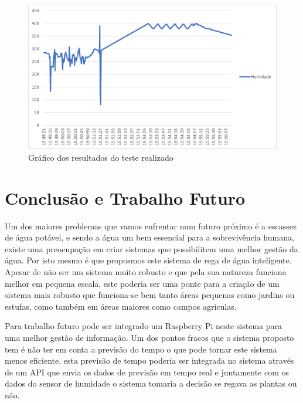 \documentclass[conference]{IEEEtran}
\begin{document}
\begin{figure}
    \centering
    \includegraphics[scale=0.5]{Humidity_test_graph.png}
    \caption{Gráfico dos resultados do teste realizado}
    \label{fig:graphic}
\end{figure}

\section{Conclusão e Trabalho Futuro}

Um dos maiores problemas que vamos enfrentar num futuro próximo é a escassez de água potável,
e sendo a água um bem essencial para a sobrevivência humana, existe uma preocupação 
em criar sistemas que possibilitem uma melhor gestão da água. Por isto mesmo 
é que proposmos este sistema de rega de água inteligente. Apesar de não ser um 
sistema muito robusto e que pela sua natureza funciona melhor em pequena escala, este 
poderia ser uma ponte para a criação de um sistema mais robusto que funciona-se bem 
tanto áreas pequenas como jardins ou estufas, como também em áreas maiores como campos agrículas.

Para trabalho futuro pode ser integrado um Raspberry Pi neste sistema para uma melhor 
gestão de informação. Um dos pontos fracos que o sistema proposto tem é não 
ter em conta a previsão do tempo o que pode tornar este sistema menos eficiente, 
esta previsão de tempo poderia ser integrada no sistema através de um API que 
envia os dados de previsão em tempo real e juntamente com os dados do sensor de 
humidade o sistema tomaria a decisão se regava as plantas ou não.



\end{document}

